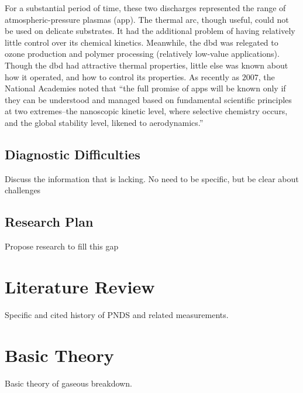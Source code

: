 For a substantial period of time, these two discharges represented the range of
atmospheric-pressure plasmas (\acs{app}). The thermal arc, though useful, could
not be used on delicate substrates. It had the additional problem of having
relatively little control over its chemical kinetics. Meanwhile, the \acs{dbd}
was relegated to ozone production and polymer processing (relatively low-value
applications). Though the \acs{dbd} had attractive thermal properties, little
else was known about how it operated, and how to control its properties. As
recently as $2007$, the National Academies noted that ``the full promise of
\acs{app}s will be known only if they can be understood and managed based on
fundamental scientific principles at two extremes--the nanoscopic kinetic level,
where selective chemistry occurs, and the global stability level, likened to
aerodynamics.''




\subsection{Diagnostic Difficulties}

Discuss the information that is lacking. No need to be specific, but be clear
about challenges

\subsection{Research Plan}

Propose research to fill this gap

\section{Literature Review}

Specific and cited history of PNDS and related measurements.

\section{Basic Theory}

Basic theory of gaseous breakdown.
